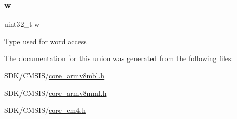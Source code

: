 \subsubsection{\texorpdfstring{w}{w}}
{\footnotesize\ttfamily uint32\+\_\+t w}

Type used for word access 

The documentation for this union was generated from the following files\+:\begin{DoxyCompactItemize}
\item 
S\+D\+K/\+C\+M\+S\+I\+S/\mbox{\hyperlink{core__armv8mbl_8h}{core\+\_\+armv8mbl.\+h}}\item 
S\+D\+K/\+C\+M\+S\+I\+S/\mbox{\hyperlink{core__armv8mml_8h}{core\+\_\+armv8mml.\+h}}\item 
S\+D\+K/\+C\+M\+S\+I\+S/\mbox{\hyperlink{core__cm4_8h}{core\+\_\+cm4.\+h}}\end{DoxyCompactItemize}
